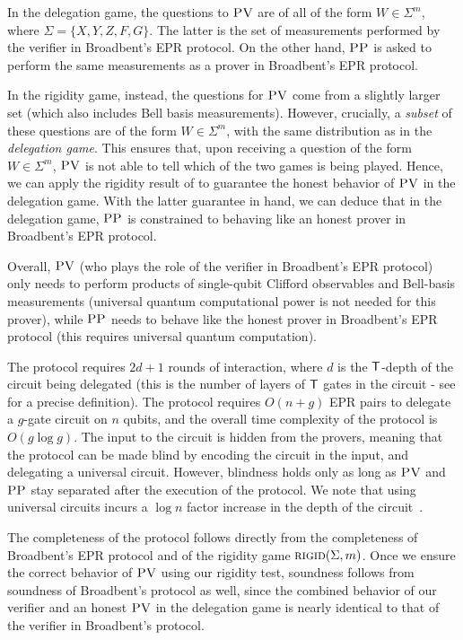 \documentclass{toc}
\newcommand{\rigid}{\textsc{rigid}}
\newcommand{\pv}{\textsc{PV}}
\newcommand{\pp}{\textsc{PP}}
\begin{document}
In the delegation game, the questions to $\pv$ are of all of the form $W\in \Sigma^m$, where $\Sigma = \{X,Y,Z,F,G\}$. The latter is the set of measurements performed by the verifier in Broadbent's EPR protocol. On the other hand, $\pp$ is asked to perform the same measurements as a prover in Broadbent's EPR protocol.

In the rigidity game, instead, the questions for $\pv$ come from a slightly larger set (which also includes Bell basis measurements). However, crucially, a \emph{subset} of these questions are of the form $W\in \Sigma^m$, with the same distribution as in the \emph{delegation game}. This ensures that, upon receiving a question of the form $W\in \Sigma^m$, $\pv$ is not able to tell which of the two games is being played. Hence, we can apply the rigidity result of  to guarantee the honest behavior of $\pv$ in the delegation game. With the latter guarantee in hand, we can deduce that in the delegation game, $\pp$ is constrained to behaving like an honest prover in Broadbent's EPR protocol.

Overall, $\pv$ (who plays the role of the verifier in Broadbent's EPR protocol) only needs to perform
products of single-qubit Clifford observables and Bell-basis measurements (universal quantum
computational power is not needed for this prover), while $\pp$ needs to behave like the honest prover in Broadbent's EPR protocol (this requires universal quantum computation).

The protocol requires $2d+1$ rounds of interaction, where $d$ is the $\sf T$-depth of the circuit being delegated (this is the number of layers of $\sf T$ gates in the circuit - see  for a precise definition). The protocol requires $O(n+g)$ EPR pairs to delegate a $g$-gate circuit on $n$ qubits, and the overall time complexity of the protocol is $O(g\log g)$.
The input to the circuit is hidden from the provers, meaning that the protocol can be made blind by encoding the circuit in the input, and delegating a universal circuit. However, blindness holds only as long as $\pv$ and $\pp$ stay separated after the execution of the protocol. We note that using universal circuits incurs a $\log{n}$ factor increase in the depth of the circuit~\cite{BeraFGH10}.

The completeness of the protocol follows directly from the completeness of Broadbent's EPR protocol and of the rigidity game $\rigid(\Sigma,m)$. Once we ensure the correct behavior of $\pv$ using our rigidity test, soundness follows from soundness of Broadbent's protocol as well, since the combined behavior of our verifier and an honest $\pv$ in the delegation game is nearly identical to that of the verifier in Broadbent's protocol.
\end{document}
